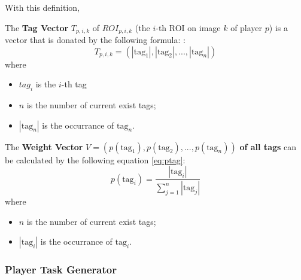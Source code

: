 With this definition, 

\begin{definition}
\label{def:tagv}
The \textbf{Tag Vector} $T_{p, i, k}$ of $ROI_{p, i, k}$ (the $i$-th ROI on image $k$ of player $p$) is a vector that 
is donated by the following formula:
:
\[
  T_{p, i, k} = (|\text{tag}_1|, |\text{tag}_2|, ..., |\text{tag}_n|)
\]
where 
\begin{itemize}
\item $tag_i$ is the $i$-th tag
\item $n$ is the number of current exist tags;
\item $|\text{tag}_n|$ is the occurrance of $\text{tag}_n$.
\end{itemize}
\end{definition}

\begin{definition}
\label{def:weightv}
The \textbf{Weight Vector} $V = (p(\text{tag}_1), p(\text{tag}_2), ..., p(\text{tag}_n))$ 
\textbf{of all tags} can be calculated by the following equation \ref{eq:ptag}:
\begin{equation}
\label{eq:ptag}
p(\text{tag}_i) = \frac{|\text{tag}_i|}{\sum_{j=1}^{n}{|\text{tag}_j|}}
\end{equation}
where
\begin{itemize}
\item $n$ is the number of current exist tags;
\item $|\text{tag}_i|$ is the occurrance of $\text{tag}_i$.
\end{itemize}
\end{definition}


\subsubsection{Player Task Generator}


